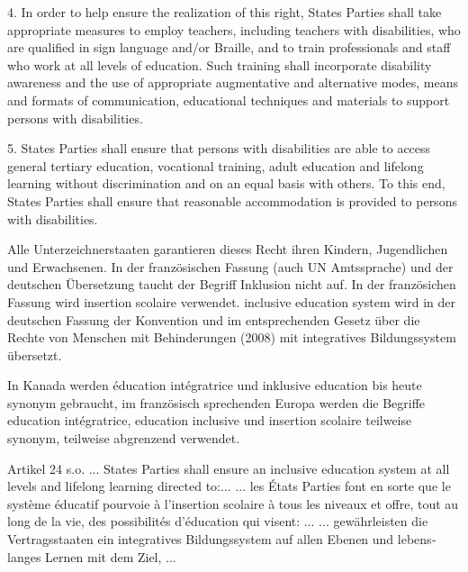 {4. In order to help ensure the realization of this right, States Parties shall take appropriate measures to employ teachers, including teachers with disabilities, who are qualified in sign language and/or Braille, and to train professionals and staff who work at all levels of education. Such training shall incorporate disability awareness and the use of appropriate augmentative and alternative modes, means and formats of communication, educational techniques and materials to support persons with disabilities. 

5. States Parties shall ensure that persons with disabilities are able to access general tertiary education, vocational training, adult education and lifelong learning without discrimination and on an equal basis with others. To this end, States Parties shall ensure that reasonable accommodation is provided to persons with disabilities. }

Alle Unterzeichnerstaaten garantieren dieses Recht ihren Kindern, Jugendlichen und Erwachsenen. In der französischen Fassung (auch UN Amtssprache) und der deutschen Übersetzung taucht der Begriff Inklusion nicht auf. In der französichen Fassung wird insertion scolaire ver­wendet. inclusive education system wird in der deutschen Fassung der Konvention und im ent­sprechenden Gesetz über die Rechte von Menschen mit Behinderungen (2008) mit integratives Bildungssystem übersetzt.

In Kanada werden éducation intégratrice und inklusive education bis heute synonym ge­braucht, im französisch sprechenden Europa werden die Begriffe education intégratrice, education inclusive und insertion scolaire teilweise synonym, teilweise abgrenzend verwendet.

Artikel 24 s.o.
... States Parties shall ensure an inclusive education system at all levels and lifelong learning directed to:... 
... les États Parties font en sorte que le système éducatif pourvoie à l’insertion scolaire à tous les niveaux et offre, tout au long de la vie, des possibilités d’éducation qui visent: ...
... gewährleisten die Vertragsstaaten ein integratives Bildungssystem auf allen Ebenen und lebens­langes Lernen mit dem Ziel, ...
